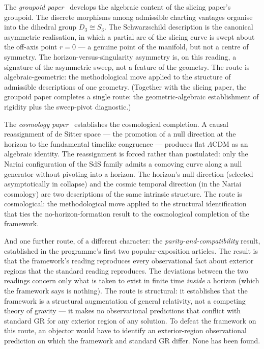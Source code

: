 \documentclass[11pt,a4paper]{article}
\begin{document}
The \textit{groupoid paper}~\cite{JanzenGroupoid} develops the algebraic content of the slicing paper's groupoid. The discrete morphisms among admissible charting vantages organise into the dihedral group $D_3 \cong S_3$. The Schwarzschild description is the canonical asymmetric realisation, in which a partial arc of the slicing curve is swept about the off-axis point $r=0$ --- a genuine point of the manifold, but not a centre of symmetry. The horizon-versus-singularity asymmetry is, on this reading, a signature of the asymmetric sweep, not a feature of the geometry. The route is algebraic-geometric: the methodological move applied to the structure of admissible descriptions of one geometry. (Together with the slicing paper, the groupoid paper completes a single route: the geometric-algebraic establishment of rigidity plus the sweep-pivot diagnostic.)

The \textit{cosmology paper}~\cite{JanzenCRcosmology} establishes the cosmological completion. A causal reassignment of de Sitter space --- the promotion of a null direction at the horizon to the fundamental timelike congruence --- produces flat $\Lambda$CDM as an algebraic identity. The reassignment is forced rather than postulated: only the Nariai configuration of the SdS family admits a comoving curve along a null generator without pivoting into a horizon. The horizon's null direction (selected asymptotically in collapse) and the cosmic temporal direction (in the Nariai cosmology) are two descriptions of the same intrinsic structure. The route is cosmological: the methodological move applied to the structural identification that ties the no-horizon-formation result to the cosmological completion of the framework.

And one further route, of a different character: the \textit{parity-and-compatibility} result, established in the programme's first two popular-exposition articles. The result is that the framework's reading reproduces every observational fact about exterior regions that the standard reading reproduces. The deviations between the two readings concern only what is taken to exist in finite time \emph{inside} a horizon (which the framework says is nothing). The route is structural: it establishes that the framework is a structural augmentation of general relativity, not a competing theory of gravity --- it makes no observational predictions that conflict with standard GR for any exterior region of any solution. To defeat the framework on this route, an objector would have to identify an exterior-region observational prediction on which the framework and standard GR differ. None has been found.
\end{document}
